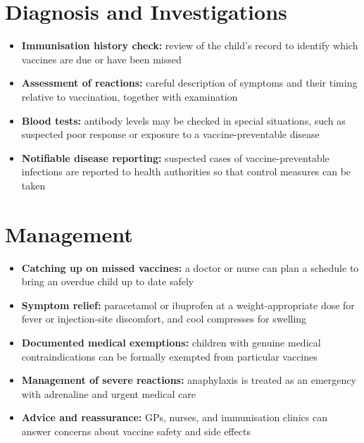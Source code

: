 \section*{Diagnosis and Investigations}
\begin{itemize}
    \item \textbf{Immunisation history check:} review of the child's record to identify which vaccines are due or have been missed
    \item \textbf{Assessment of reactions:} careful description of symptoms and their timing relative to vaccination, together with examination
    \item \textbf{Blood tests:} antibody levels may be checked in special situations, such as suspected poor response or exposure to a vaccine-preventable disease
    \item \textbf{Notifiable disease reporting:} suspected cases of vaccine-preventable infections are reported to health authorities so that control measures can be taken
\end{itemize}

\section*{Management}
\begin{itemize}
    \item \textbf{Catching up on missed vaccines:} a doctor or nurse can plan a schedule to bring an overdue child up to date safely
    \item \textbf{Symptom relief:} paracetamol or ibuprofen at a weight-appropriate dose for fever or injection-site discomfort, and cool compresses for swelling
    \item \textbf{Documented medical exemptions:} children with genuine medical contraindications can be formally exempted from particular vaccines
    \item \textbf{Management of severe reactions:} anaphylaxis is treated as an emergency with adrenaline and urgent medical care
    \item \textbf{Advice and reassurance:} GPs, nurses, and immunisation clinics can answer concerns about vaccine safety and side effects
\end{itemize}

